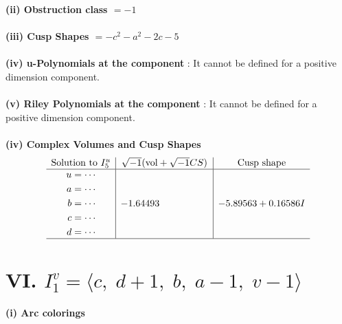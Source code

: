 \documentclass[1p]{elsarticle_modified}
\theoremstyle{definition}
\newcommand{\I}{\sqrt{-1}}
\begin{document}
\flushleft \textbf{(ii) Obstruction class $= -1$}\\~\\
\flushleft \textbf{(iii) Cusp Shapes $= - c^2- a^2-2 c-5$}\\~\\
\flushleft \textbf{(iv) u-Polynomials at the component} : It cannot be defined for a positive dimension component.\\~\\
\flushleft \textbf{(v) Riley Polynomials at the component} : It cannot be defined for a positive dimension component.\\~\\
\newpage\flushleft \textbf{(iv) Complex Volumes and Cusp Shapes}
$$\begin{array}{c|c|c} 
\text{Solution to }I^u_{5}& \I (\text{vol} + \sqrt{-1}CS) & \text{Cusp shape}\\
 \hline 
\begin{aligned}
u &= \cdots \\
a &= \cdots \\
b &= \cdots \\
c &= \cdots \\
d &= \cdots\end{aligned}
 & -1.64493\phantom{ +0.000000I} & -5.89563 + 0.16586 I\\
 \hline 
 \end{array}
$$\newpage\renewcommand{\arraystretch}{1}
\centering \section*{VI. $I^v_{1}= \langle c,\;d+1,\;b,\;a-1,\;v-1 \rangle$}
\flushleft \textbf{(i) Arc colorings}\\
\end{document}
